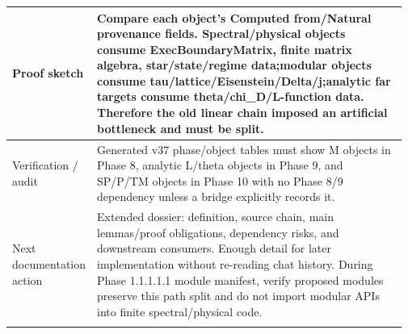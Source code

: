 \begin{longtable}{L{0.16\linewidth} L{0.81\linewidth}}
\hline\addlinespace[0.20em]
Proof sketch & Compare each object's Computed from/\allowbreak{}Natural provenance fields. Spectral/\allowbreak{}physical objects consume ExecBoundaryMatrix, finite matrix algebra, star/\allowbreak{}state/\allowbreak{}regime data;\newline modular objects consume tau/\allowbreak{}lattice/\allowbreak{}Eisenstein/\allowbreak{}Delta/\allowbreak{}j;\newline analytic far targets consume theta/\allowbreak{}chi\_D/\allowbreak{}L-function data. Therefore the old linear chain imposed an artificial bottleneck and must be split.\\
\hline\addlinespace[0.20em]
Verification /\allowbreak{} audit & Generated v37 phase/\allowbreak{}object tables must show M objects in Phase 8, analytic L/\allowbreak{}theta objects in Phase 9, and SP/\allowbreak{}P/\allowbreak{}TM objects in Phase 10 with no Phase 8/\allowbreak{}9 dependency unless a bridge explicitly records it.\\
\hline\addlinespace[0.20em]
Next documentation action & Extended dossier: definition, source chain, main lemmas/\allowbreak{}proof obligations, dependency risks, and downstream consumers. Enough detail for later implementation without re-reading chat history. During Phase 1.1.1.1.1 module manifest, verify proposed modules preserve this path split and do not import modular APIs into finite spectral/\allowbreak{}physical code.\\
\hline\addlinespace[0.20em]
\end{longtable}
